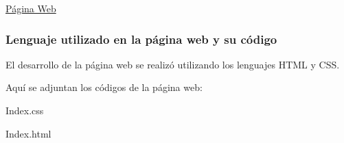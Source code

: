 \documentclass{article}
\begin{document}
\begin{center}
    \href{https://proyectobias.github.io/Bias/}{Página Web}
\end{center}

\subsubsection{Lenguaje utilizado en la página web y su código}
El desarrollo de la página web se realizó utilizando los lenguajes HTML y CSS.

Aquí se adjuntan los códigos de la página web:

\begin{center}
    Index.css
\end{center}



\begin{center}
    Index.html
\end{center}


\end{document}
